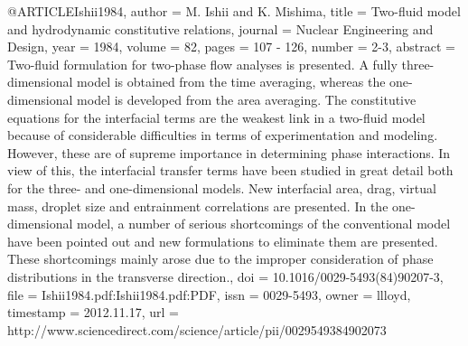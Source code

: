 {@ARTICLE{Ishii1984,
  author = {M. Ishii and K. Mishima},
  title = {Two-fluid model and hydrodynamic constitutive relations},
  journal = {Nuclear Engineering and Design},
  year = {1984},
  volume = {82},
  pages = {107 - 126},
  number = {2-3},
  abstract = {Two-fluid formulation for two-phase flow analyses is presented. A
	fully three-dimensional model is obtained from the time averaging,
	whereas the one-dimensional model is developed from the area averaging.
	The constitutive equations for the interfacial terms are the weakest
	link in a two-fluid model because of considerable difficulties in
	terms of experimentation and modeling. However, these are of supreme
	importance in determining phase interactions. In view of this, the
	interfacial transfer terms have been studied in great detail both
	for the three- and one-dimensional models. New interfacial area,
	drag, virtual mass, droplet size and entrainment correlations are
	presented. In the one-dimensional model, a number of serious shortcomings
	of the conventional model have been pointed out and new formulations
	to eliminate them are presented. These shortcomings mainly arose
	due to the improper consideration of phase distributions in the transverse
	direction.},
  doi = {10.1016/0029-5493(84)90207-3},
  file = {Ishii1984.pdf:Ishii1984.pdf:PDF},
  issn = {0029-5493},
  owner = {llloyd},
  timestamp = {2012.11.17},
  url = {http://www.sciencedirect.com/science/article/pii/0029549384902073}
}

}

